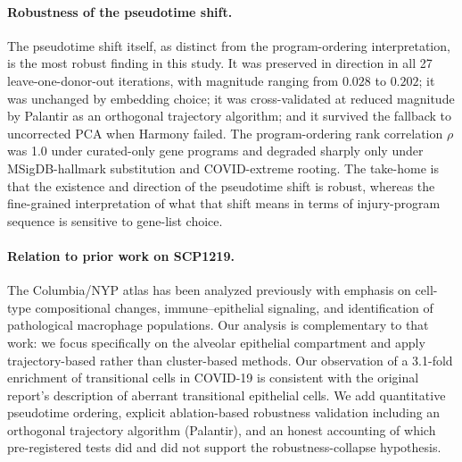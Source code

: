 \documentclass[11pt]{article}
\begin{document}
\paragraph{Robustness of the pseudotime shift.} The pseudotime shift itself, as distinct from the program-ordering interpretation, is the most robust finding in this study. It was preserved in direction in all 27 leave-one-donor-out iterations, with magnitude ranging from $0.028$ to $0.202$; it was unchanged by embedding choice; it was cross-validated at reduced magnitude by Palantir as an orthogonal trajectory algorithm; and it survived the fallback to uncorrected PCA when Harmony failed. The program-ordering rank correlation $\rho$ was 1.0 under curated-only gene programs and degraded sharply only under MSigDB-hallmark substitution and COVID-extreme rooting. The take-home is that the existence and direction of the pseudotime shift is robust, whereas the fine-grained interpretation of what that shift means in terms of injury-program sequence is sensitive to gene-list choice.

\paragraph{Relation to prior work on SCP1219.} The Columbia/NYP atlas \citep{Melms2021} has been analyzed previously with emphasis on cell-type compositional changes, immune--epithelial signaling, and identification of pathological macrophage populations. Our analysis is complementary to that work: we focus specifically on the alveolar epithelial compartment and apply trajectory-based rather than cluster-based methods. Our observation of a 3.1-fold enrichment of transitional cells in COVID-19 is consistent with the original report's description of aberrant transitional epithelial cells. We add quantitative pseudotime ordering, explicit ablation-based robustness validation including an orthogonal trajectory algorithm (Palantir), and an honest accounting of which pre-registered tests did and did not support the robustness-collapse hypothesis.
\end{document}
